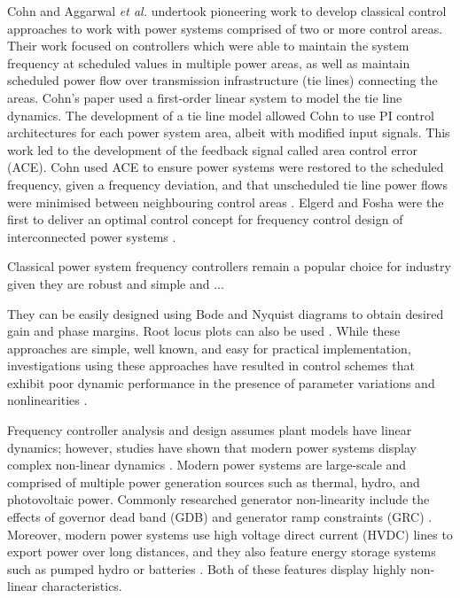 Cohn \cite{Cohn1971} and Aggarwal \textit{et al.} \cite{Aggarwal1968, Aggarwal1968a} undertook pioneering work to develop classical control approaches to work with power systems comprised of two or more control areas. Their work focused on controllers which were able to maintain the system frequency at scheduled values in multiple power areas, as well as maintain scheduled power flow over transmission infrastructure (tie lines) connecting the areas. Cohn's paper used a first-order linear system to model the tie line dynamics. The development of a tie line model allowed Cohn to use PI control architectures for each power system area, albeit with modified input signals. This work led to the development of the feedback signal called area control error (ACE). Cohn used ACE to ensure power systems were restored to the scheduled frequency, given a frequency deviation, and that unscheduled tie line power flows were minimised between neighbouring control areas \cite{Cohn1956}. Elgerd and Fosha were the first to deliver an optimal control concept for frequency control design of interconnected power systems \cite{Elgerd1970}. 

Classical power system frequency controllers remain a popular choice for industry given they are robust and simple and ...

They can be easily designed using Bode and Nyquist diagrams to obtain desired gain and phase margins. Root locus plots can also be used \cite{Ogat2010}. While these approaches are simple, well known, and easy for practical implementation, investigations using these approaches have resulted in control schemes that exhibit poor dynamic performance in the presence of parameter variations and nonlinearities \cite{Kundur1994, Elgerd1970, Bechert1977}.

Frequency controller analysis and design assumes plant models have linear dynamics; however, studies have shown that modern power systems display complex non-linear dynamics \cite{Concordia1957, Kwatny1975, Elgerd1994, Morsali2014}. Modern power systems are large-scale and comprised of multiple power generation sources such as thermal, hydro, and photovoltaic power. Commonly researched generator non-linearity include the effects of governor dead band (GDB) \cite{Concordia1957} and generator ramp constraints (GRC) \cite{Kwatny1975, Elgerd1994}. Moreover, modern power systems use high voltage direct current (HVDC) lines to export power over long distances, and they also feature energy storage systems such as pumped hydro or batteries \cite{Bevrani2011, Glover2012, Kothari2011, Kundur1994}. Both of these features display highly non-linear characteristics.

